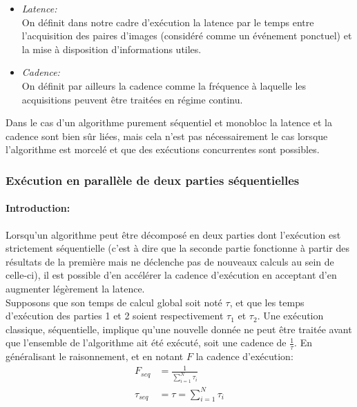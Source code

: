 \begin{itemize}
	\item{\emph{Latence:\\}}
	On définit dans notre cadre d'exécution la latence par le temps entre l'acquisition des paires d'images (considéré comme un événement ponctuel) et la mise à disposition d'informations utiles.\\
	
	\item{\emph{Cadence:\\}}
	On définit par ailleurs la cadence comme la fréquence à laquelle les acquisitions peuvent être traitées en régime continu.\\
\end{itemize}
Dans le cas d'un algorithme purement séquentiel et monobloc la latence et la cadence sont bien sûr liées, mais cela n'est pas nécessairement le cas lorsque l'algorithme est morcelé et que des exécutions concurrentes sont possibles.

\subsubsection{Exécution en parallèle de deux parties séquentielles}
\paragraph{Introduction:\\}
Lorsqu'un algorithme peut être décomposé en deux parties dont l'exécution est strictement séquentielle (c'est à dire que la seconde partie fonctionne à partir des résultats de la première mais ne déclenche pas de nouveaux calculs au sein de celle-ci), il est possible d'en accélérer la cadence d'exécution en acceptant d'en augmenter légèrement la latence.\\ Supposons que son temps de calcul global soit noté $\tau$, et que les temps d'exécution des parties 1 et 2 soient respectivement $\tau_1$ et $\tau_2$. Une exécution \og classique\fg{}, séquentielle, implique qu'une nouvelle donnée ne peut être traitée avant que l'ensemble de l'algorithme ait été exécuté, soit une cadence de $\frac{1}{\tau}$. En généralisant le raisonnement, et en notant $F$ la cadence d'exécution:
\begin{align}
	F_{seq} &= \frac{1}{\sum\limits_{i=1}^{N} \tau_i } \\
	\tau_{seq} &= \tau = \sum\limits_{i=1}^{N} \tau_i 
\end{align}

